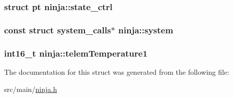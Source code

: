 \hypertarget{structninja_a17e28f0fc4b9027ccae23d6575abd9c4}{
\subsubsection[{state\+\_\+ctrl}]{\setlength{\rightskip}{0pt plus 5cm}struct {\bf pt} ninja\+::state\+\_\+ctrl}}\label{structninja_a17e28f0fc4b9027ccae23d6575abd9c4}
\hypertarget{structninja_ae1be21982288780db80754039eedfd94}{
\subsubsection[{system}]{\setlength{\rightskip}{0pt plus 5cm}const struct {\bf system\+\_\+calls}$\ast$ ninja\+::system}}\label{structninja_ae1be21982288780db80754039eedfd94}
\hypertarget{structninja_a34e33e47d1f66c97893be765ece89aaf}{
\subsubsection[{telem\+Temperature1}]{\setlength{\rightskip}{0pt plus 5cm}int16\+\_\+t ninja\+::telem\+Temperature1}}\label{structninja_a34e33e47d1f66c97893be765ece89aaf}


The documentation for this struct was generated from the following file\+:\begin{DoxyCompactItemize}
\item 
src/main/\hyperlink{ninja_8h}{ninja.\+h}\end{DoxyCompactItemize}
